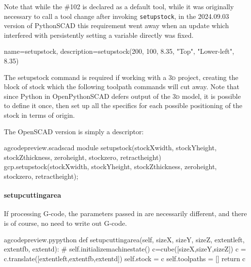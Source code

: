 \documentclass{ltxdoc}
\begin{document}
Note that while the \#102 is declared as a default tool, while it was originally necessary to call a tool change after invoking \verb|setupstock|, in the 2024.09.03 version of PythonSCAD this requirement went away when an update which interfered with persistently setting a variable directly was fixed.


{
    name=setupstock, 
    description={setupstock(200, 100, 8.35, "Top", "Lower-left", 8.35)}
}

\noindent The \gls{setupstock} command is required if working with a \textsc{3d} project, creating the block of stock which the following toolpath commands will cut away. Note that since Python in OpenPythonSCAD defers output of the \textsc{3d} model, it is possible to define it once, then set up all the specifics for each possible positioning of the stock in terms of origin.

The OpenSCAD version is simply a descriptor:

\lstset{firstnumber=\thegcpscad}
\begin{writecode}{a}{gcodepreview.scad}{scad}
module setupstock(stockXwidth, stockYheight, stockZthickness, zeroheight, stockzero, retractheight) {
    gcp.setupstock(stockXwidth, stockYheight, stockZthickness, zeroheight, stockzero, retractheight);
}

\end{writecode}
\addtocounter{gcpscad}{4}

\paragraph{setupcuttingarea}

If processing G-code, the parameters passed in are necessarily different, and there is of course, no need to write out G-code. 

\lstset{firstnumber=\thegcpy}
\begin{writecode}{a}{gcodepreview.py}{python}
    def setupcuttingarea(self, sizeX, sizeY, sizeZ, extentleft, extentfb, extentd):
#        self.initializemachinestate() 
        c=cube([sizeX,sizeY,sizeZ])
        c = c.translate([extentleft,extentfb,extentd])
        self.stock = c
        self.toolpaths = []
        return c
        
\end{writecode}
\addtocounter{gcpy}{8}
\end{document}

